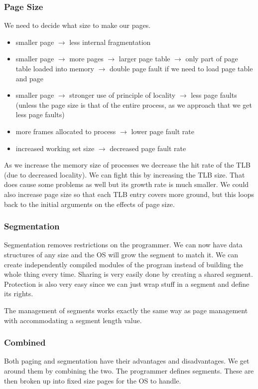 \documentclass[12pt]{article}
\begin{document}
\subsubsection*{Page Size}
We need to decide what size to make our pages.
\begin{itemize}
  \item smaller page $\rightarrow$ less internal fragmentation
  \item smaller page $\rightarrow$ more pages $\rightarrow$ larger page table $\rightarrow$ only part of page table loaded into memory $\rightarrow$ double page fault if we need to load page table and page
  \item smaller page $\rightarrow$ stronger use of principle of locality $\rightarrow$ less page faults (unless the page size is that of the entire process, as we approach that we get less page faults)
  \item more frames allocated to process $\rightarrow$ lower page fault rate
  \item increased working set size $\rightarrow$ decreased page fault rate
\end{itemize}

As we increase the memory size of processes we decrease the hit rate of the TLB (due to decreased locality). We can fight this by increasing the TLB size. That does cause some problems as well but its growth rate is much smaller. We could also increase page size so that each TLB entry covers more ground, but this loops back to the initial arguments on the effects of page size.

\subsubsection*{Segmentation}
Segmentation removes restrictions on the programmer. We can now have data structures of any size and the OS will grow the segment to match it. We can create independently compiled modules of the program instead of building the whole thing every time. Sharing is very easily done by creating a shared segment. Protection is also very easy since we can just wrap stuff in a segment and define its rights.

The management of segments works exactly the same way as page management with accommodating a segment length value.

\subsubsection*{Combined}
Both paging and segmentation have their advantages and disadvantages. We get around them by combining the two. The programmer defines segments. These are then broken up into fixed size pages for the OS to handle.
\end{document}
